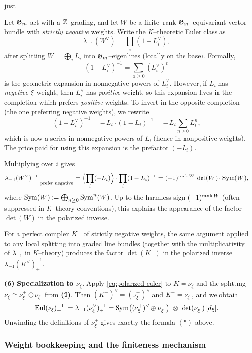 just \documentclass[12pt]{article}
\DeclareMathOperator{\Eul}{Eul}
\begin{document}
\begin{remark}
\label{rem:det-factor}
Let $\mathfrak{G}_m$ act with a $\mathbb{Z}$--grading, and let $W$ be a finite--rank $\mathfrak{G}_m$--equivariant
vector bundle with \emph{strictly negative} weights.
Write the $K$--theoretic Euler class as
\[
\lambda_{-1}(W^\vee)=\prod_{i}(1-L_i^\vee),
\]
after splitting $W=\bigoplus_i L_i$ into $\mathfrak{G}_m$--eigenlines (locally on the base).
Formally,
\[
(1-L_i^\vee)^{-1}=\sum_{n\ge 0}(L_i^\vee)^n
\]
is the geometric expansion in nonnegative powers of $L_i^\vee$.
However, if $L_i$ has \emph{negative} $\xi$--weight, then $L_i^\vee$ has \emph{positive}
weight, so this expansion lives in the completion which prefers \emph{positive} weights.
To invert in the opposite completion (the one preferring negative weights), we rewrite
\[
(1-L_i^\vee)^{-1}
= -\,L_i\cdot (1-L_i)^{-1}
= -\,L_i\sum_{n\ge 0} L_i^{n},
\]
which is now a series in nonnegative powers of $L_i$ (hence in nonpositive weights).
The price paid for using this expansion is the prefactor $(-L_i)$.

Multiplying over $i$ gives
\[
\lambda_{-1}(W^\vee)^{-1}\Big|_{\text{prefer negative}}
=
\Bigl(\prod_i (-L_i)\Bigr)\cdot \prod_i (1-L_i)^{-1}
=
(-1)^{\operatorname{rank} W}\,\det(W)\cdot \operatorname{Sym}(W),
\]
where $\operatorname{Sym}(W):=\bigoplus_{n\ge 0}\operatorname{Sym}^n(W)$.
Up to the harmless sign $(-1)^{\operatorname{rank} W}$ (often suppressed in $K$--theory conventions),
this explains the appearance of the factor $\det(W)$ in the polarized inverse.

For a perfect complex $K^-$ of strictly negative weights, the same argument applied
to any local splitting into graded line bundles (together with the multiplicativity
of $\lambda_{-1}$ in $K$--theory) produces the factor $\det(K^-)$ in the polarized inverse
$\lambda_{-1}(K^\vee)^{-1}_+$.
\end{remark}

\noindent\textbf{(6) Specialization to $\nu_\xi$.}
Apply \eqref{eq:polarized-euler} to $K=\nu_\xi$ and the splitting
$\nu_\xi\simeq \nu_\xi^+\oplus \nu_\xi^-$ from \textbf{(2)}.
Then $(K^+)^\vee=(\nu_\xi^+)^\vee$ and $K^-=\nu_\xi^-$, and we obtain
\[
\Eul(\nu_\xi)^{-1}_+
:=
\lambda_{-1}(\nu_\xi^\vee)^{-1}_+
=
\Sym\bigl((\nu_\xi^+)^\vee \oplus \nu_\xi^-\bigr)\ \otimes\ \det(\nu_\xi^-)\,[d_\xi].
\]
Unwinding the definitions of $\nu_\xi^\pm$ gives exactly the formula $(\ast)$ above.

\subsubsection*{Weight bookkeeping and the finiteness mechanism}
\end{document}
